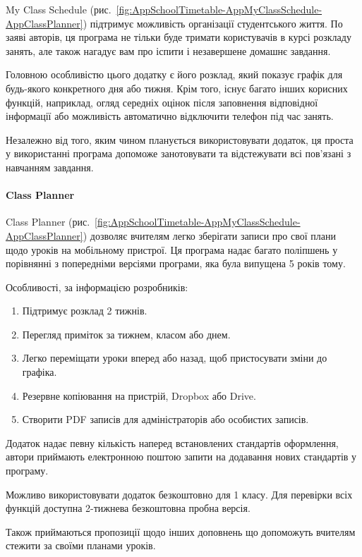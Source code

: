 My Class Schedule (рис.~\ref{fig:AppSchoolTimetable-AppMyClassSchedule-AppClassPlanner}) підтримує можливість організації студентського життя. По заяві авторів, ця програма не тільки буде тримати користувачів в курсі розкладу занять, але також нагадує вам про іспити і незавершене домашнє завдання.

Головною особливістю цього додатку є його розклад, який показує графік для будь-якого конкретного дня або тижня. Крім того, існує багато інших корисних функцій, наприклад, огляд середніх оцінок після заповнення відповідної інформації або можливість автоматично відключити телефон під час занять.

Незалежно від того, яким чином планується використовувати додаток, ця проста у використанні програма допоможе занотовувати та відстежувати всі пов'язані з навчанням завдання.

\paragraph{Class Planner}

Class Planner (рис.~\ref{fig:AppSchoolTimetable-AppMyClassSchedule-AppClassPlanner}) дозволяє вчителям легко зберігати записи про свої плани щодо уроків на мобільному пристрої. Ця програма надає багато поліпшень у порівнянні з попередніми версіями програми, яка була випущена 5 років тому.

Особливості, за інформацією розробників:
\begin{enumerate}
    \item Підтримує розклад 2 тижнів.
    \item Перегляд приміток за тижнем, класом або днем.
    \item Легко переміщати уроки вперед або назад, щоб пристосувати зміни до графіка.
    \item Резервне копіювання на пристрій, Dropbox або Drive.
    \item Створити PDF записів для адміністраторів або особистих записів.
\end{enumerate}

Додаток надає певну кількість наперед встановлених стандартів оформлення, автори приймають електронною поштою запити на додавання нових стандартів у програму.

Можливо використовувати додаток безкоштовно для 1 класу. Для перевірки всіх функцій доступна 2-тижнева безкоштовна пробна версія.

Також приймаються пропозиції щодо інших доповнень що допоможуть вчителям стежити за своїми планами уроків.

